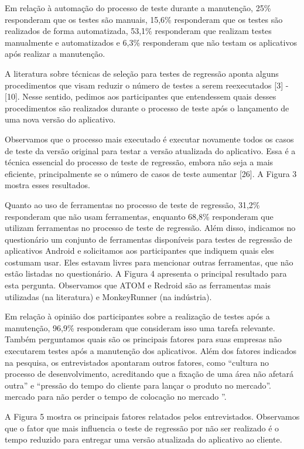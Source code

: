 \begin{enumerate}[label=\bf QP\arabic*]
Em relação à automação do processo de teste durante a manutenção, 25\% responderam que os testes são manuais, 15,6\% responderam que os testes são realizados de forma automatizada, 53,1\% responderam que realizam testes manualmente e automatizados e 6,3\% responderam que não testam os aplicativos após realizar a manutenção.

A literatura sobre técnicas de seleção para testes de regressão aponta alguns procedimentos que visam reduzir o número de testes a serem reexecutados [3] - [10]. Nesse sentido, pedimos aos participantes que entendessem quais desses procedimentos são realizados durante o processo de teste após o lançamento de uma nova versão do aplicativo.

Observamos que o processo mais executado é executar novamente todos os casos de teste da versão original para testar a versão atualizada do aplicativo. Essa é a técnica essencial do processo de teste de regressão, embora não seja a mais eficiente, principalmente se o número de casos de teste aumentar [26]. A Figura 3 mostra esses resultados.


Quanto ao uso de ferramentas no processo de teste de regressão, 31,2\% responderam que não usam ferramentas, enquanto 68,8\% responderam que utilizam ferramentas no processo de teste de regressão. Além disso, indicamos no questionário um conjunto de ferramentas disponíveis para testes de regressão de aplicativos Android e solicitamos aos participantes que indiquem quais eles costumam usar. Eles estavam livres para mencionar outras ferramentas, que não estão listadas no questionário. A Figura 4 apresenta o principal resultado para esta pergunta. Observamos que ATOM e Redroid são as ferramentas mais utilizadas (na literatura) e MonkeyRunner (na indústria).

Em relação à opinião dos participantes sobre a realização de testes após a manutenção, 96,9\% responderam que consideram isso uma tarefa relevante. Também perguntamos quais são os principais fatores para suas empresas não executarem testes após a manutenção dos aplicativos. Além dos fatores indicados na pesquisa, os entrevistados apontaram outros fatores, como “cultura no processo de desenvolvimento, acreditando que a fixação de uma área não afetará outra” e “pressão do tempo do cliente para lançar o produto no mercado”. mercado para não perder o tempo de colocação no mercado ”.

A Figura 5 mostra os principais fatores relatados pelos entrevistados. Observamos que o fator que mais influencia o teste de regressão por não ser realizado é o tempo reduzido para entregar uma versão atualizada do aplicativo ao cliente.


\end{enumerate}
